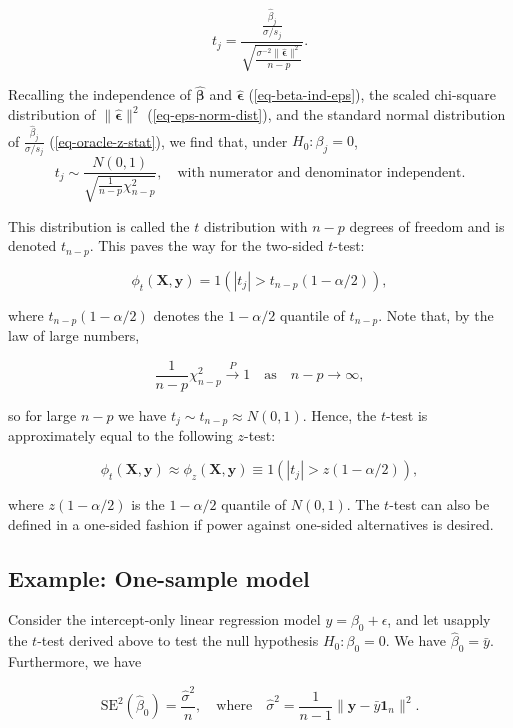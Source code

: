 \documentclass[
  11pt,
  letterpaper,
  oneside]{book}
\theoremstyle{plain}
\theoremstyle{plain}
\theoremstyle{definition}
\theoremstyle{definition}
\theoremstyle{plain}
\theoremstyle{remark}
\begin{document}
\[
t_j = \frac{\frac{\widehat{\beta}_j}{\sigma/s_j}}{\sqrt{\frac{\sigma^{-2}\|\boldsymbol{\widehat{\epsilon}}\|^2}{n-p}}}.
\]

Recalling the independence of \(\boldsymbol{\widehat{\beta}}\) and
\(\boldsymbol{\widehat{\epsilon}}\) (\ref{eq-beta-ind-eps}), the scaled
chi-square distribution of \(\|\boldsymbol{\widehat{\epsilon}}\|^2\)
(\ref{eq-eps-norm-dist}), and the standard normal distribution of
\(\frac{\widehat{\beta}_j}{\sigma/s_j}\) (\ref{eq-oracle-z-stat}), we
find that, under \(H_0:\beta_j = 0\), \[
t_j \sim \frac{N(0,1)}{\sqrt{\frac{1}{n-p}\chi^2_{n-p}}}, \quad \text{with numerator and denominator independent.}
\]

This distribution is called the \(t\) distribution with \(n-p\) degrees
of freedom and is denoted \(t_{n-p}\). This paves the way for the
two-sided \(t\)-test:

\[
\phi_t(\boldsymbol{X}, \boldsymbol{y}) = 1(|t_j| > t_{n-p}(1-\alpha/2)),
\]

where \(t_{n-p}(1-\alpha/2)\) denotes the \(1-\alpha/2\) quantile of
\(t_{n-p}\). Note that, by the law of large numbers,

\[
\frac{1}{n-p}\chi^2_{n-p} \overset{P}{\rightarrow} 1 \quad \text{as} \quad n - p \rightarrow \infty,
\]

so for large \(n-p\) we have \(t_{j} \sim t_{n-p} \approx N(0,1)\).
Hence, the \(t\)-test is approximately equal to the following
\(z\)-test:

\[
\phi_t(\boldsymbol{X}, \boldsymbol{y}) \approx \phi_z(\boldsymbol{X}, \boldsymbol{y}) \equiv 1(|t_j| > z(1-\alpha/2)),
\]

where \(z(1-\alpha/2)\) is the \(1-\alpha/2\) quantile of \(N(0,1)\).
The \(t\)-test can also be defined in a one-sided fashion if power
against one-sided alternatives is desired.

\hypertarget{example-one-sample-model}{%
\subsection{Example: One-sample model}\label{example-one-sample-model}}

Consider the intercept-only linear regression model
\(y = \beta_0 + \epsilon\), and let usapply the \(t\)-test derived above
to test the null hypothesis \(H_0: \beta_0 = 0\). We have
\(\widehat{\beta}_0 = \bar{y}\). Furthermore, we have

\[
\text{SE}^2(\widehat{\beta}_0) = \frac{\widehat{\sigma}^2}{n}, \quad \text{where} \quad \widehat{\sigma}^2 = \frac{1}{n-1}\|\boldsymbol{y} - \bar{y} \boldsymbol{1}_n\|^2.
\]
\end{document}
